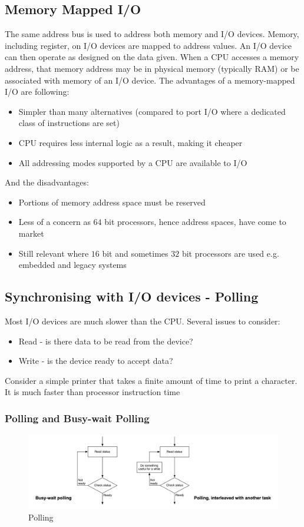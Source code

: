 \documentclass[a4paper]{article}
\theoremstyle{plain}
\theoremstyle{definition}
\theoremstyle{remark}
\begin{document}
\subsection{Memory Mapped I/O}
The same address bus is used to address both memory and I/O devices. Memory, including register, on I/O devices are mapped to address values. An I/O device can then operate as designed on the data given. When a CPU accesses a memory address, that memory address may be in physical memory (typically RAM) or be associated with memory of an I/O device. The advantages of a memory-mapped I/O are following:
\begin{itemize}
	\item Simpler than many alternatives (compared to port I/O where a dedicated class of instructions are set)
	\item CPU requires less internal logic as a result, making it cheaper
	\item All addressing modes supported by a CPU are available to I/O
\end{itemize}
And the disadvantages:
\begin{itemize}
	\item Portions of memory address space must be reserved
	\item Less of a concern as $64$ bit processors, hence address spaces, have come to market
	\item Still relevant where $16$ bit and sometimes $32$ bit processors are used e.g. embedded and legacy systems
\end{itemize}
\subsection{Synchronising with I/O devices - Polling}
Most I/O devices are much slower than the CPU. Several issues to consider:
\begin{itemize}
	\item Read - is there data to be read from the device?
	\item Write - is the device ready to accept data?
\end{itemize}
Consider a simple printer that takes a finite amount of time to print a character. It is much faster than processor instruction time
\subsubsection{Polling and Busy-wait Polling}
\begin{figure}[H]
	\centering
	\includegraphics[width=1\textwidth]{figures/polling.png}
	\caption{Polling}
	\label{fig:polling}
\end{figure}
\end{document}
